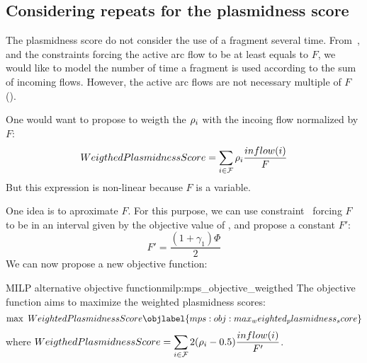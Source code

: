 \subsection{Considering repeats for the plasmidness score}

The plasmidness score do not consider the use of a fragment several time.
From~, and the constraints forcing the active arc flow to be at least equals to \(F\), we would like to model the number of time a fragment is used according to the sum of incoming flows.
However, the active arc flows are not necessary multiple of \(F\) ().

One would want to propose to weigth the \(\rho_{i}\) with the incoing flow normalized by \(F\):
\[
  WeigthedPlasmidnessScore = \sum_{i \in \mathcal{F}{}} \rho_{i} \frac{inflow(i)}{F}
\]
But this expression is non-linear because \(F\) is a variable.

One idea is to aproximate \(F\).
For this purpose, we can use constraint~ forcing \(F\) to be in an interval given by the objective value of \MCF{}, and propose a constant \(F'\):
\[
  F' = \frac{ (1 + \gamma_1) \Phi }{2}
\]
We can now propose a new objective function:

\begin{definition}{\MPS{} MILP alternative objective function}{milp:mps_objective_weigthed}
  The objective function aims to maximize the weighted plasmidness scores:
  \begin{equation}
    \max ~ WeightedPlasmidnessScore
    \objlabel{mps:obj:max_weighted_plasmidness_score} %
  \end{equation}
  where \(\displaystyle WeigthedPlasmidnessScore = \sum_{i \in \mathcal{F}{}} 2 (\rho_{i} - 0.5) \frac{inflow(i)}{F'} \).
\end{definition}
